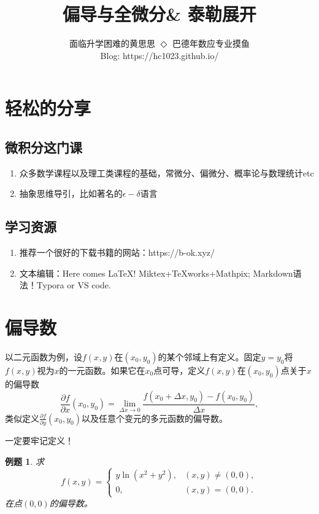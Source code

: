 \documentclass[UTF8]{ctexart}
\author{面临升学困难的黄思思 $\Diamond$ 巴德年数应专业摸鱼 \\ Blog: https://hc1023.github.io/}
\title{偏导与全微分\& 泰勒展开}
\newtheorem{example}{例题}
\begin{document}
\maketitle


\section{轻松的分享}
\subsection{微积分这门课}
\begin{enumerate}
\item 众多数学课程以及理工类课程的基础，常微分、偏微分、概率论与数理统计etc

\item 抽象思维导引，比如著名的$\epsilon - \delta$语言
\end{enumerate}

\subsection{学习资源}
\begin{enumerate}
\item 推荐一个很好的下载书籍的网站：https://b-ok.xyz/
\item 文本编辑：Here comes \LaTeX! Miktex+TeXworks+Mathpix; Markdown语法！Typora or VS code. 
\end{enumerate}

\section{偏导数}
以二元函数为例，设$f(x,y)$在$(x_0,y_0)$的某个邻域上有定义。固定$y=y_0$将$f(x,y)$视为$x$的一元函数。如果它在$x_0$点可导，定义$f(x,y)$在$(x_0,y_0)$点关于$x$的偏导数
$$\frac{\partial f}{\partial x}\left(x_{0}, y_{0}\right)=\lim _{\Delta x \rightarrow 0} \frac{f\left(x_{0}+\Delta x, y_{0}\right)-f\left(x_{0}, y_{0}\right)}{\Delta x},$$
类似定义$\frac{\partial f}{\partial y}\left(x_{0}, y_{0}\right)$以及任意个变元的多元函数的偏导数。

一定要牢记定义！

\begin{example}
求
$$f(x, y)=\left\{\begin{array}{ll}
y \ln \left(x^{2}+y^{2}\right), & (x, y) \neq(0,0), \\
0, & (x, y)=(0,0).
\end{array}\right.$$
在点$(0,0)$的偏导数。
\end{example}
\end{document}
